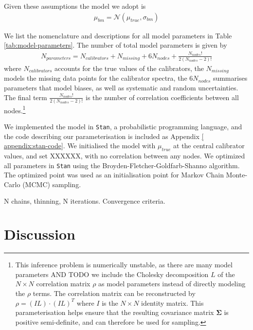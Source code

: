 \documentclass[preprint]{aastex}
\newcommand{\normal}[2]{\mathcal{N}\left(#1, #2\right)}
\begin{document}
Given these assumptions the model we adopt is
\begin{eqnarray}
    \mu_{bm} = \normal{\mu_{true}}{\sigma_{bm}} 
\end{eqnarray} 



We list the nomenclature and descriptions for all model parameters in Table 
\ref{tab:model-parameters}. The number of total model parameters is given by
\begin{eqnarray}
    N_{parameters} = N_{calibrators} + N_{missing} + 6N_{nodes} + \frac{N_{nodes}!}{2(N_{nodes} - 2)!}
\end{eqnarray}
where $N_{calibrators}$ accounts for the true values of the calibrators, the
$N_{missing}$ models the missing data points for the calibrator spectra, the
$6N_{nodes}$ summarises parameters that model biases, as well as systematic
and random uncertainties. The final term $\frac{N_{nodes}!}{2(N_{nodes} - 2)!}$
is the number of correlation coefficients between all nodes.\footnote{
This inference problem is numerically unstable, as there are many model parameters
AND TODO
we include the Cholesky decomposition $L$ of the $N \times N$ correlation matrix $\rho$
as model parameters instead of directly modeling the $\rho$ terms.  The correlation
matrix can be reconstructed by $\rho = (IL)\cdot(IL)^T$ where $I$ is the $N \times N$
identity matrix. This parameterisation helps ensure that the resulting covariance
matrix $\mathbf{\Sigma}$ is positive semi-definite, and can therefore be used for
sampling.} 



We implemented the model in \texttt{Stan}, a probabilistic programming
language, and the code describing our parameterisation is included as Appendix \ref{
appendix:stan-code}. We initialised the model with $\mu_{true}$ at the central
calibrator values, and set XXXXXX, with no correlation between any nodes. We
optimized all parameters in \texttt{Stan} using the Broyden-Fletcher-Goldfarb-Shanno
algorithm. The optimized point was used as an initialisation point for Markov Chain
Monte-Carlo (MCMC) sampling.

N chains, thinning, N iterations. Convergence criteria.
 
 







\section{Discussion}
\label{sec:discussion}
\end{document}
